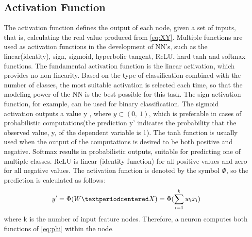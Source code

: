     
    \subsection{Activation Function} \label{subsec:activation_funs}
    Τhe activation function defines the output of each node, given a set of inputs, that is, calculating the real value produced from \ref{eq:XY}.
    Multiple functions are used as activation functions in the development of NN's, such as the linear(identity), sign, sigmoid, hyperbolic tangent, ReLU, hard tanh and softmax functions. The fundamental activation function is the linear activation, which provides no non-linearity. Based on the type of classification combined with the number of classes, the most suitable activation is selected each time, so that the modeling power of the NN is the best possible for this task. The sign activation function, for example, can be used for binary classification. The sigmoid activation outputs a value y , where $y \subset (0,\ 1)$, which is preferable in cases of probabilistic computations(the prediction y' indicates the probability that the observed value, y, of the dependent variable is 1). The tanh function is usually used when the output of the computations is desired to be both positive and negative. Softmax results in probabilistic outputs, suitable for predicting one of multiple classes. ReLU is linear (identity function) for all positive values and zero for all negative values. The activation function is denoted by the symbol $\Phi$, so the prediction is calculated as follows: 
    \begin{equation} \label{eq:phi}
         y' = \Phi ( W · X  ) = \Phi ( \sum_{i=1}^{k} w\textsubscript{i} x\textsubscript{i} )
    \end{equation}
    where k is the number of input feature nodes. 
    Therefore, a neuron computes both functions of \ref{eq:phi} within the node.
   
    
